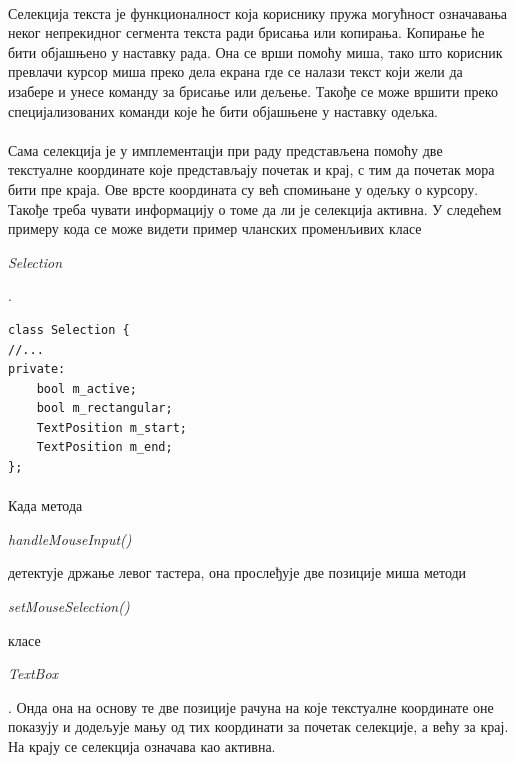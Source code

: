 \documentclass[12pt,oneside]{memoir}
\begin{document}
\paragraph{}
Селекција текста је функционалност која кориснику пружа могућност означавања
неког непрекидног сегмента текста ради брисања или копирања. Копирање ће бити
објашњено у наставку рада. Она се врши помоћу миша, тако што корисник превлачи
курсор миша преко дела екрана где се налази текст који жели да изабере и унесе
команду за брисање или дељење. Такође се може вршити преко специјализованих команди
које ће бити објашњене у наставку одељка.

\paragraph{}
Сама селекција је у имплементацји при раду представљена помоћу две текстуалне
координате које представљају почетак и крај, с тим да почетак мора бити пре краја.
Ове врсте координата су већ спомињане у одељку о курсору. Такође треба чувати информацију о томе да ли је селекција активна. У следећем примеру кода се може
видети пример чланских променљивих класе 
\begin{latinica}\textit{Selection}\end{latinica}.

\begin{verbatim}
class Selection {
//...
private:
	bool m_active;
	bool m_rectangular;
	TextPosition m_start;
	TextPosition m_end;
};
\end{verbatim}


\paragraph{}
Када метода \begin{latinica}\textit{handleMouseInput()}\end{latinica} детектује држање
левог тастера, она прослеђује две позиције миша методи \begin{latinica}\textit{setMouseSelection()}\end{latinica} класе
\begin{latinica}\textit{TextBox}\end{latinica}. Онда она на основу те две позиције
рачуна на које текстуалне координате оне показују и додељује мању од тих координати
за почетак селекције, а већу за крај. На крају се селекција означава као активна.
\end{document}
